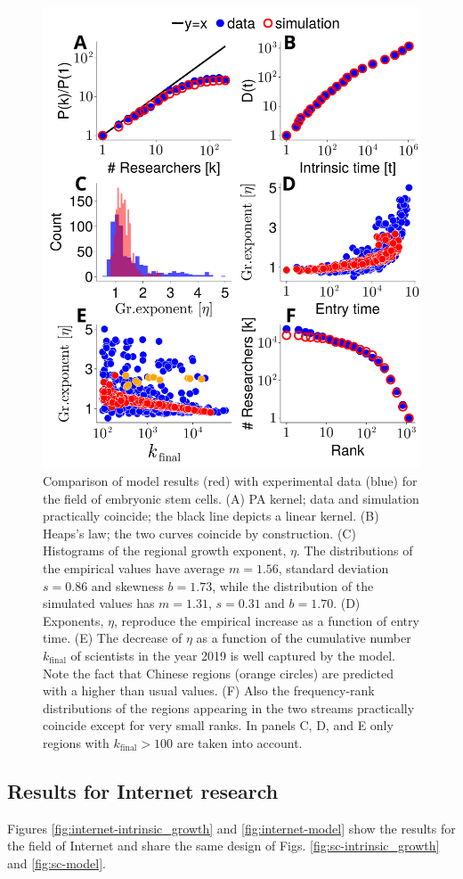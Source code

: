 \documentclass[draft,final]{vutinfth} %
\begin{document}
\begin{figure}
    \centering
\includegraphics[width=0.8\linewidth]{figures_csf/fig4-cells.pdf}
    \caption{Comparison of model results (red) with experimental data  (blue) for the field of embryonic stem cells.
    (A) PA kernel; data and simulation practically coincide; the black line depicts a linear kernel.
    (B) Heaps's law; the two curves coincide by construction.
    (C) Histograms of the regional growth exponent, $\eta$.  
    The distributions of the empirical values have average $m=1.56$, standard deviation $s=0.86$ and skewness $b=1.73$, while the distribution of the simulated values has $m=1.31$, $s=0.31$ and $b=1.70$.
    (D) Exponents, $\eta$, reproduce the empirical increase as a function of entry time.
    (E) The decrease of $\eta$ as a function of the cumulative number $k_\mathrm{final}$ of scientists in the year 2019 is well captured by the model. Note the fact that Chinese regions (orange circles) are predicted with a higher than usual values.
    (F) Also the frequency-rank distributions of the regions appearing in the two streams practically coincide except for very small ranks.
    In panels C, D, and E only regions with $k_\mathrm{final}>100$ are taken into account.
    }
    \label{fig:cells-model}
\end{figure}


\subsection{Results for Internet research}
\label{app:internet}
Figures \ref{fig:internet-intrinsic_growth} and \ref{fig:internet-model} show the results for the field of Internet and share the same design of Figs. \ref{fig:sc-intrinsic_growth} and \ref{fig:sc-model}.
\end{document}
